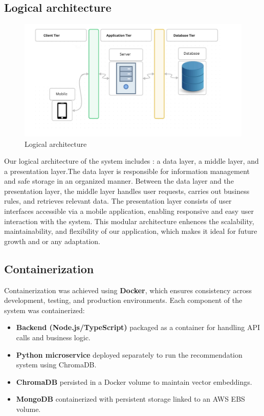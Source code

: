 \subsection{Logical architecture}

\begin{center}
\begin{figure}[ht]
            \centering
            \includegraphics[scale=0.44]{images/logic_arch.png}
            \caption{Logical architecture }
            \label{fig:Logical_architecture_of_the_system}
\end{figure}
\end{center}


Our logical architecture of the system includes : a data layer, a middle layer, and a presentation layer.The data layer is responsible for information management and safe storage in an organized manner. Between the data layer and the presentation layer, the middle layer handles user requests, carries out business rules, and retrieves relevant data. The presentation layer consists of user interfaces accessible via a mobile application, enabling responsive and easy user interaction with the system.
This modular architecture enhences the scalability, maintainability, and flexibility of our application, which makes it ideal for future growth and or any adaptation.

\subsection{Containerization}
Containerization was achieved using \textbf{Docker}, which ensures
consistency across development, testing, and production
environments. Each component of the system was containerized:
\begin{itemize}
    \item \textbf{Backend (Node.js/TypeScript)} packaged as a
    container for handling API calls and business logic.
    \item \textbf{Python microservice} deployed separately to run the
    recommendation system using ChromaDB.
    \item \textbf{ChromaDB} persisted in a Docker volume to maintain
    vector embeddings.
    \item \textbf{MongoDB} containerized with persistent storage
    linked to an AWS EBS volume.
\end{itemize}

